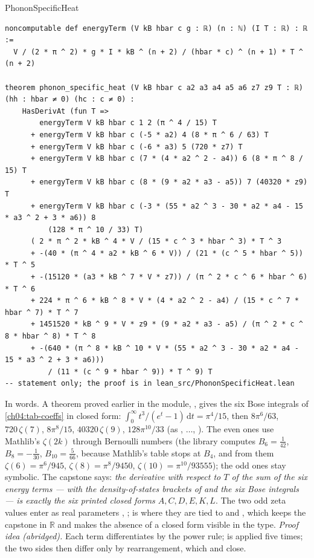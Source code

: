 \begin{leanbox}{PhononSpecificHeat}
\begin{lstlisting}[style=lean,basicstyle=\ttfamily\footnotesize]
noncomputable def energyTerm (V kB hbar c g : ℝ) (n : ℕ) (I T : ℝ) : ℝ :=
  V / (2 * π ^ 2) * g * I * kB ^ (n + 2) / (hbar * c) ^ (n + 1) * T ^ (n + 2)

theorem phonon_specific_heat (V kB hbar c a2 a3 a4 a5 a6 z7 z9 T : ℝ) (hh : hbar ≠ 0) (hc : c ≠ 0) :
    HasDerivAt (fun T =>
        energyTerm V kB hbar c 1 2 (π ^ 4 / 15) T
      + energyTerm V kB hbar c (-5 * a2) 4 (8 * π ^ 6 / 63) T
      + energyTerm V kB hbar c (-6 * a3) 5 (720 * z7) T
      + energyTerm V kB hbar c (7 * (4 * a2 ^ 2 - a4)) 6 (8 * π ^ 8 / 15) T
      + energyTerm V kB hbar c (8 * (9 * a2 * a3 - a5)) 7 (40320 * z9) T
      + energyTerm V kB hbar c (-3 * (55 * a2 ^ 3 - 30 * a2 * a4 - 15 * a3 ^ 2 + 3 * a6)) 8
          (128 * π ^ 10 / 33) T)
      ( 2 * π ^ 2 * kB ^ 4 * V / (15 * c ^ 3 * hbar ^ 3) * T ^ 3
      + -(40 * (π ^ 4 * a2 * kB ^ 6 * V)) / (21 * (c ^ 5 * hbar ^ 5)) * T ^ 5
      + -(15120 * (a3 * kB ^ 7 * V * z7)) / (π ^ 2 * c ^ 6 * hbar ^ 6) * T ^ 6
      + 224 * π ^ 6 * kB ^ 8 * V * (4 * a2 ^ 2 - a4) / (15 * c ^ 7 * hbar ^ 7) * T ^ 7
      + 1451520 * kB ^ 9 * V * z9 * (9 * a2 * a3 - a5) / (π ^ 2 * c ^ 8 * hbar ^ 8) * T ^ 8
      + -(640 * (π ^ 8 * kB ^ 10 * V * (55 * a2 ^ 3 - 30 * a2 * a4 - 15 * a3 ^ 2 + 3 * a6)))
          / (11 * (c ^ 9 * hbar ^ 9)) * T ^ 9) T
-- statement only; the proof is in lean_src/PhononSpecificHeat.lean
\end{lstlisting}
\end{leanbox}

\noindent In words.
A theorem proved earlier in the module, , gives the six Bose integrals of \cref{ch04:tab-coeffs} in closed form: $\int_0^\infty t^3/(e^t-1)\,\mathrm dt=\pi^4/15$, then $8\pi^6/63$, $720\,\zeta(7)$, $8\pi^8/15$, $40320\,\zeta(9)$, $128\pi^{10}/33$ (as , $\dots$, ).
The even ones use Mathlib's $\zeta(2k)$ through Bernoulli numbers (the library computes $B_6=\tfrac1{42}$, $B_8=-\tfrac1{30}$, $B_{10}=\tfrac5{66}$, because Mathlib's table stops at $B_4$, and from them $\zeta(6)=\pi^6/945$, $\zeta(8)=\pi^8/9450$, $\zeta(10)=\pi^{10}/93555$); the odd ones stay symbolic.
The capstone  says: \emph{the derivative with respect to $T$ of the sum of the six energy terms --- with the density-of-states brackets of  and the six Bose integrals --- is exactly the six printed closed forms $A,C,D,E,K,L$}.
The two odd zeta values enter as real parameters , ;  is where they are tied to  and , which keeps the capstone in $\mathbb R$ and makes the absence of a closed form visible in the type.
\emph{Proof idea (abridged).} Each term differentiates by the power rule;  is applied five times; the two sides then differ only by rearrangement, which  and  close.

